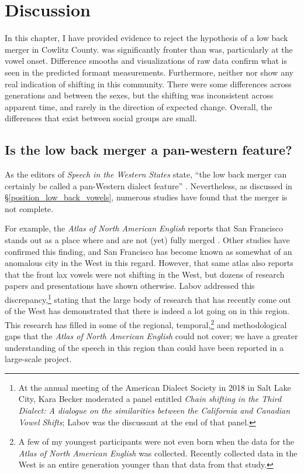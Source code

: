 \section{Discussion}

In this chapter, I have provided evidence to reject the hypothesis of a low back merger in Cowlitz County. \lot was significantly fronter than \thought was, particularly at the vowel onset. Difference smooths and visualizations of raw data confirm what is seen in the predicted formant measurements. Furthermore, neither \lot nor \thought show any real indication of shifting in this community. There were some differences across generations and between the sexes, but the shifting was inconsistent across apparent time, and rarely in the direction of expected change. Overall, the differences that exist between social groups are small.

\subsection{Is the low back merger a pan-western feature?}

As the editors of \textit{Speech in the Western States} state, ``the low back merger can certainly be called a pan-Western dialect feature'' \citep[167]{fridland_etal_2017_pads}. Nevertheless, as discussed in \S\ref{position_low_back_vowels}, numerous studies have found that the merger is not complete.

For example, the \textit{Atlas of North American English} reports that San Francisco stands out as a place where \lot and \thought are not (yet) fully merged \citep[64]{labov_ash_boberg_2006_anae}. Other studies \citep{moonwomon_1991_diss, hall_lew_2013} have confirmed this finding, and San Francisco has become known as somewhat of an anomalous city in the West in this regard. However, that same atlas also reports that the front lax vowels were not shifting in the West, but dozens of research papers and presentations have shown otherwise. Labov addressed this discrepancy,\footnote{At the annual meeting of the American Dialect Society in 2018 in Salt Lake City, Kara Becker moderated a panel entitled \textit{Chain shifting in the Third Dialect: A dialogue on the similarities between the California and Canadian Vowel Shifts}; Labov was the discussant at the end of that panel.} stating that the large body of research that has recently come out of the West has demonstrated that there is indeed a lot going on in this region. This research has filled in some of the regional, temporal,\footnote{A few of my youngest participants were not even born when the data for the \textit{Atlas of North American English} was collected. Recently collected data in the West is an entire generation younger than that data from that study.} and methodological gaps that the \textit{Atlas of North American English} could not cover; we have a greater understanding of the speech in this region than could have been reported in a large-scale project.

